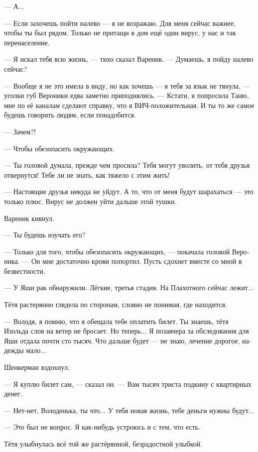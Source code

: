 \documentclass[a5paper,12pt,fleqn]{extbook}\usepackage{cooltooltips}\usepackage{polyglossia}\setdefaultlanguage[babelshorthands=true]{russian}\setotherlanguage{english}\defaultfontfeatures{Ligatures=TeX,Mapping=tex-text} \usepackage{xcolor}\definecolor{lightgray}{HTML}{bbbbbb}\color{lightgray}\newcommand{\ml}[3]{\textenglish{\textcolor{black}{#3}}}
\newcommand{\asterism}{\vspace{1em}{\centering\Large\bfseries$\ast~\ast~\ast$\par}\vspace{1em}}
\newcommand{\textspace}{\vspace{1em}{\centering\Large\bfseries<...>\par}\vspace{1em}}
\begin{document}
--- А...

--- Если захочешь пойти налево --- я не возражаю.
Для меня сейчас важнее, чтобы ты был рядом.
Только не притащи в дом ещё один вирус, у нас и так перенаселение.

--- Я искал тебя всю жизнь, --- тихо сказал Вареник.
--- Думаешь, я пойду налево сейчас?

--- Вообще я не это имела в виду, но как хочешь --- я тебя за язык не тянула, --- уголки губ Вероники едва заметно приподнялись.
--- Кстати, я попросила Таню, мне по её каналам сделают справку, что я ВИЧ-положительная.
И ты то же самое будешь говорить людям, если понадобится.

--- Зачем?!

--- Чтобы обезопасить окружающих.

--- Ты головой думала, прежде чем просила?
Тебя могут уволить, от тебя друзья отвернутся!
Тебе ли не знать, как тяжело с этим жить!

--- Настоящие друзья никуда не уйдут.
А то, что от меня будут шарахаться --- это только плюс.
Вирус не должен уйти дальше этой тушки.

Вареник кивнул.

--- Ты будешь изучать его?

--- Только для того, чтобы обезопасить окружающих, --- покачала головой Вероника.
--- Он мне достаточно крови попортил.
Пусть сдохнет вместе со мной в безвестности.

\asterism

\textspace

--- У Яши рак обнаружили.
Лёгкие, третья стадия.
На Плахотного сейчас лежит...

Тётя растерянно глядела по сторонам, словно не понимая, где находится.

--- Володя, я помню, что я обещала тебе оплатить билет.
Ты знаешь, тётя Изольда слов на ветер не бросает.
Но теперь...
Я позавчера за обследования для Яши отдала почти сто тысяч.
Что дальше будет --- не знаю, лечение дорогое, надежды мало...

Шенкерман вздохнул.

--- Я куплю билет сам, --- сказал он.
--- Вам тысяч триста подкину с квартирных денег.

--- Нет-нет, Володенька, ты что...
У тебя новая жизнь, тебе деньги нужны будут...

--- Это был не вопрос.
Я как-нибудь устроюсь и с тем, что есть.

Тётя улыбнулась всё той же растёрянной, безрадостной улыбкой.
\end{document}
